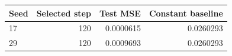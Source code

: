 \begin{tabular}{lrrr}\toprule Seed & Selected step & Test MSE & Constant baseline\\\midrule
17 & 120 & 0.0000615 & 0.0260293\\
29 & 120 & 0.0009693 & 0.0260293\\
\bottomrule\end{tabular}
